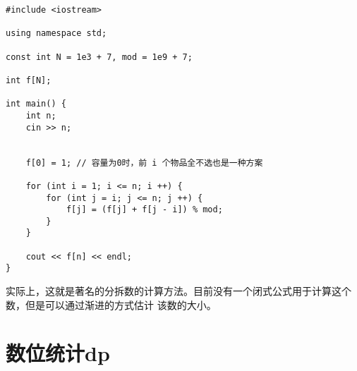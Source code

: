 \documentclass[12pt,a4paper,UTF16]{ctexbook}
\theoremstyle{plain}
\begin{document}
\begin{lstlisting}
#include <iostream>

using namespace std;

const int N = 1e3 + 7, mod = 1e9 + 7;

int f[N];

int main() {
    int n;
    cin >> n;


    f[0] = 1; // 容量为0时，前 i 个物品全不选也是一种方案

    for (int i = 1; i <= n; i ++) {
        for (int j = i; j <= n; j ++) {
            f[j] = (f[j] + f[j - i]) % mod;
        }
    }

    cout << f[n] << endl;
}
\end{lstlisting}
实际上，这就是著名的分拆数的计算方法。目前没有一个闭式公式用于计算这个数，但是可以通过渐进的方式估计
该数的大小。

\section{数位统计dp}
\end{document}
